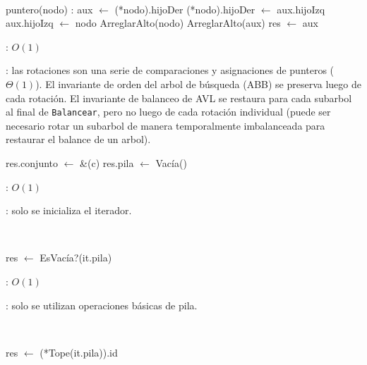 \begin{Algoritmos}
	~

	\begin{algorithm}[H]
		\NoCaptionOfAlgo
		\caption{}
		\BlankLine
		puntero(nodo) : aux $\leftarrow$ (*nodo).hijoDer
		(*nodo).hijoDer $\leftarrow$ aux.hijoIzq
		aux.hijoIzq $\leftarrow$ nodo
		ArreglarAlto(nodo)
		ArreglarAlto(aux)
		res $\leftarrow$ aux
	\end{algorithm}
	
	\complejidad: $O(1)$

	\justifcomp: las rotaciones son una serie de comparaciones y asignaciones de punteros ($\Theta(1)$). El invariante de orden del arbol de búsqueda (ABB) se preserva luego de cada rotación. El invariante de balanceo de AVL se restaura para cada subarbol al final de \texttt{Balancear}, pero no luego de cada rotación individual (puede ser necesario rotar un subarbol de manera temporalmente imbalanceada para restaurar el balance de un arbol).


	\begin{algorithm}[H]
		\NoCaptionOfAlgo
		\caption{}
		res.conjunto $\leftarrow$ \&(c)
		res.pila $\leftarrow$ Vacía()
	\end{algorithm}

	\complejidad: $O(1)$

	\justifcomp: solo se inicializa el iterador.

	~

	\begin{algorithm}[H]
		\NoCaptionOfAlgo
		\caption{}
		res $\leftarrow$ EsVacía?(it.pila)
	\end{algorithm}

	\complejidad: $O(1)$

	\justifcomp: solo se utilizan operaciones básicas de pila.

	~

	\begin{algorithm}[H]
		\NoCaptionOfAlgo
		\caption{}
		res $\leftarrow$ (*Tope(it.pila)).id
	\end{algorithm}


\end{Algoritmos}
